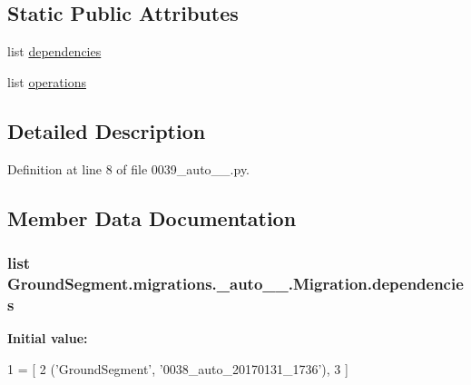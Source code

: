 \subsection*{Static Public Attributes}
\begin{DoxyCompactItemize}
\item 
list \hyperlink{class_ground_segment_1_1migrations_1_10039__auto__20170131__2008_1_1_migration_a6d069871f604d6567c1a624bfdf76c0b}{dependencies}
\item 
list \hyperlink{class_ground_segment_1_1migrations_1_10039__auto__20170131__2008_1_1_migration_a32138965e26dddecb0f339eeeada1df2}{operations}
\end{DoxyCompactItemize}


\subsection{Detailed Description}


Definition at line 8 of file 0039\+\_\+auto\+\_\+\_.\+py.



\subsection{Member Data Documentation}
\hypertarget{class_ground_segment_1_1migrations_1_10039__auto__20170131__2008_1_1_migration_a6d069871f604d6567c1a624bfdf76c0b}{}
\subsubsection[{dependencies}]{\setlength{\rightskip}{0pt plus 5cm}list Ground\+Segment.\+migrations.\+\_\+auto\+\_\+\_.\+Migration.\+dependencies\hspace{0.3cm}{\ttfamily [static]}}\label{class_ground_segment_1_1migrations_1_10039__auto__20170131__2008_1_1_migration_a6d069871f604d6567c1a624bfdf76c0b}
{\bfseries Initial value\+:}
\begin{DoxyCode}
1 = [
2         (\textcolor{stringliteral}{'GroundSegment'}, \textcolor{stringliteral}{'0038\_auto\_20170131\_1736'}),
3     ]
\end{DoxyCode}


